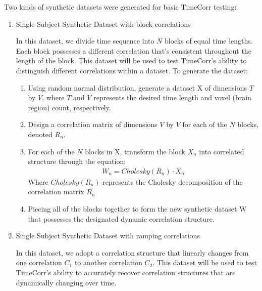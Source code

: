 \documentclass[12pt]{article}
\begin{document}
Two kinds of synthetic datasets were generated for basic TimeCorr testing:
\begin{enumerate}
\item Single Subject Synthetic Dataset with block correlations

In this dataset, we divide time sequence into $N$ blocks of equal time lengths. Each block possesses a different correlation that's consistent throughout the length of the block. This dataset will be used to test TimeCorr's ability to distinguish different correlations within a dataset. To generate the dataset:
\begin{enumerate}
\item Using random normal distribution, generate a dataset X of dimensions $T$ by $V$, where $T$ and $V$ represents the desired time length and voxel (brain region) count, respectively.
\item Design a correlation matrix of dimensions $V$ by $V$ for each of the $N$ blocks, denoted $R_n$.
\item For each of the $N$ blocks in X, transform the block $X_n$ into correlated structure through the equation:
\begin{align*}
W_n = Cholesky(R_n) \cdot X_n
\end{align*}
Where $Cholesky(R_n)$ represents the Cholesky decomposition of the correlation matrix $R_n$
\item Piecing all of the blocks together to form the new synthetic dataset W that possesses the designated dynamic correlation structure.
\end{enumerate}

\item Single Subject Synthetic Dataset with ramping correlations

In this dataset, we adopt a correlation structure that linearly changes from one correlation $C_1$ to another correlation $C_2$. This dataset will be used to test TimeCorr's ability to accurately recover correlation structures that are dynamically changing over time.


\end{enumerate}
\end{document}
